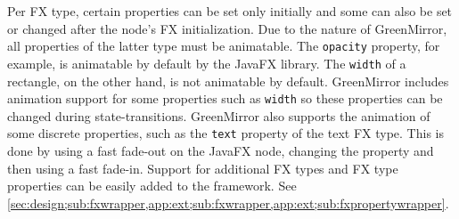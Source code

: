 \par Per FX type, certain properties can be set only initially and some can also be set or changed after the node's FX initialization. Due to the nature of GreenMirror, all properties of the latter type must be animatable. The \texttt{opacity} property, for example, is animatable by default by the JavaFX library. The \texttt{width} of a rectangle, on the other hand, is not animatable by default. GreenMirror includes animation support for some properties such as \texttt{width} so these properties can be changed during state-transitions. GreenMirror also supports the animation of some discrete properties, such as the \texttt{text} property of the text FX type. This is done by using a fast fade-out on the JavaFX node, changing the property and then using a fast fade-in. Support for additional FX types and FX type properties can be easily added to the framework. See \cref{sec:design;sub:fxwrapper,app:ext;sub:fxwrapper,app:ext;sub:fxpropertywrapper}.
